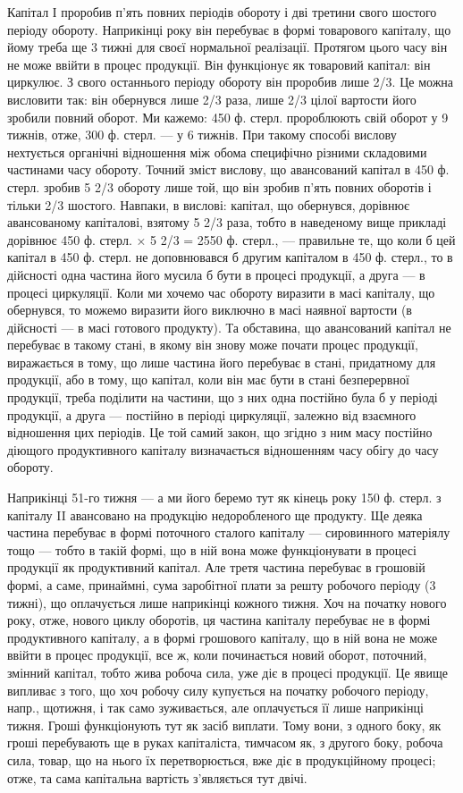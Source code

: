 Капітал І проробив п’ять повних періодів обороту і дві третини свого
шостого періоду обороту. Наприкінці року він перебуває в формі товарового
капіталу, що йому треба ще 3 тижні для своєї нормальної реалізації.
Протягом цього часу він не може ввійти в процес продукції.
Він функціонує як товаровий капітал: він циркулює. З свого останнього
періоду обороту він проробив лише 2/3. Це можна висловити так: він
обернувся лише 2/3 раза, лише 2/3 цілої вартости його зробили повний оборот.
Ми кажемо: 450 ф. стерл. пророблюють свій оборот у 9 тижнів, отже,
300 ф. стерл. — у 6 тижнів. При такому способі вислову нехтується органічні
відношення між обома специфічно різними складовими частинами часу обороту.
Точний зміст вислову, що авансований капітал в 450 ф. стерл. зробив
5 2/3 обороту лише той, що він зробив п’ять повних оборотів і тільки
2/3 шостого. Навпаки, в вислові: капітал, що обернувся, дорівнює
авансованому капіталові, взятому 5 2/3 раза, тобто в наведеному вище прикладі
дорівнює 450 ф. стерл. × 5 2/3 = 2550 ф. стерл., — правильне те, що
коли б цей капітал в 450 ф. стерл. не доповнювався б другим капіталом
в 450 ф. стерл., то в дійсності одна частина його мусила б бути в процесі
продукції, а друга — в процесі циркуляції. Коли ми хочемо час обороту
виразити в масі капіталу, що обернувся, то можемо виразити його
виключно в масі наявної вартости (в дійсності — в масі готового продукту).
Та обставина, що авансований капітал не перебуває в такому
стані, в якому він знову може почати процес продукції, виражається в
тому, що лише частина його перебуває в стані, придатному для продукції,
або в тому, що капітал, коли він має бути в стані безперервної продукції,
треба поділити на частини, що з них одна постійно була б у періоді
продукції, а друга — постійно в періоді циркуляції, залежно від взаємного
відношення цих періодів. Це той самий закон, що згідно з ним
масу постійно діющого продуктивного капіталу визначається відношенням
часу обігу до часу обороту.

Наприкінці 51-го тижня — а ми його беремо тут як кінець року
150 ф. стерл. з капіталу II авансовано на продукцію недоробленого ще
продукту. Ще деяка частина перебуває в формі поточного сталого капіталу
— сировинного матеріялу тощо — тобто в такій формі, що в ній
вона може функціонувати в процесі продукції як продуктивний капітал.
Але третя частина перебуває в грошовій формі, а саме, принаймні, сума
заробітної плати за решту робочого періоду (3 тижні), що оплачується
лише наприкінці кожного тижня. Хоч на початку нового року, отже, нового
циклу оборотів, ця частина капіталу перебуває не в формі продуктивного
капіталу, а в формі грошового капіталу, що в ній вона не може
ввійти в процес продукції, все ж, коли починається новий оборот, поточний,
змінний капітал, тобто жива робоча сила, уже діє в процесі продукції.
Це явище випливає з того, що хоч робочу силу купується на початку
робочого періоду, напр., щотижня, і так само зуживається, але
оплачується її лише наприкінці тижня. Гроші функціонують тут як засіб
виплати. Тому вони, з одного боку, як гроші перебувають ще в руках
капіталіста, тимчасом як, з другого боку, робоча сила, товар, що на
нього їх перетворюється, вже діє в продукційному процесі; отже, та сама
капітальна вартість з’являється тут двічі.

